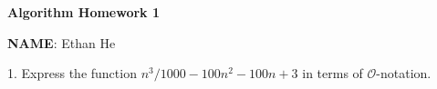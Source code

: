 \documentclass[12pt]{article}
\newcommand{\bigO}{\mathcal{O}}
\begin{document}
\begin{center}
    \textbf{Algorithm Homework 1}
\end{center}


\textbf{NAME}: Ethan He

1. Express the function $n^3/1000 - 100n^2 -100n + 3$ in terms of $\bigO$-notation.
\end{document}
